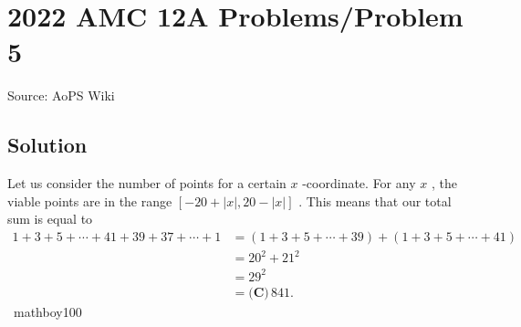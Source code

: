\documentclass[12pt]{article}
\begin{document}
\section*{{2022 AMC 12A Problems/Problem 5}}
Source: AoPS Wiki

\subsection*{Solution}
Let us consider the number of points for a certain $x$ -coordinate. For any $x$ , the viable points are in the range $[-20 + |x|, 20 - |x|]$ . This means that our total sum is equal to \begin{align*} 1 + 3 + 5 + \cdots + 41 + 39 + 37 + \cdots + 1 &= (1 + 3 + 5 + \cdots + 39) + (1 + 3 + 5 + \cdots + 41) \\ & = 20^2 + 21^2 \\ & = 29^2 \\ &= \boxed{\textbf{(C)} \, 841}. \end{align*} ~mathboy100
\end{document}
